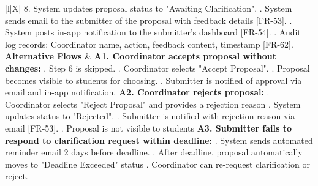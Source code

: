 \begin{xltabular}{\textwidth}{|l|X|}
        8. System updates proposal status to "Awaiting Clarification". . System sends email to the submitter of the proposal with feedback details [FR-53]. . System posts in-app notification to the submitter's dashboard [FR-54]. . Audit log records: Coordinator name, action, feedback content, timestamp [FR-62]. \\ \hline
    \textbf{Alternative Flows} &
        \textbf{A1. Coordinator accepts proposal without changes:} . Step 6 is skipped. . Coordinator selects "Accept Proposal". . Proposal becomes visible to students for choosing. . Submitter is notified of approval via email and in-app notification. \newline
        \textbf{A2. Coordinator rejects proposal:} . Coordinator selects "Reject Proposal" and provides a rejection reason . System updates status to "Rejected". . Submitter is notified with rejection reason via email [FR-53]. . Proposal is not visible to students \newline
        \textbf{A3. Submitter fails to respond to clarification request within deadline:} . System sends automated reminder email 2 days before deadline. . After deadline, proposal automatically moves to "Deadline Exceeded" status . Coordinator can re-request clarification or reject. \\ \hline
\end{xltabular}

